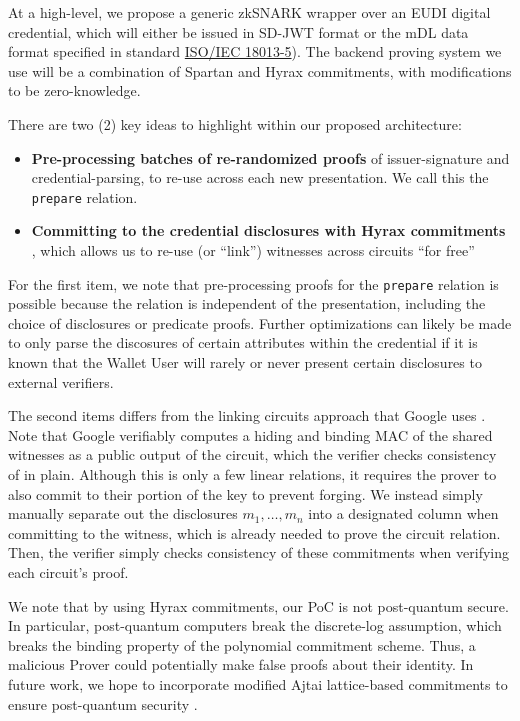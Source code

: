 At a high-level, we propose a generic zkSNARK wrapper over an EUDI digital credential, which will either be issued in SD-JWT format or the mDL data format specified in standard \href{https://mobiledl-e5018.web.app/ISO_18013-5_E_draft.pdf}{ISO/IEC 18013-5}). The backend proving system we use will be a combination of Spartan and Hyrax commitments, with modifications to be zero-knowledge. 

There are two (2) key ideas to highlight within our proposed architecture:

\begin{itemize}
    \item \textbf{Pre-processing batches of re-randomized proofs} of issuer-signature and credential-parsing, to re-use across each new presentation. We call this the \texttt{prepare} relation.
    \item \textbf{Committing to the credential disclosures with Hyrax commitments} \cite{cryptoeprint:2017/1132}, which allows us to re-use (or ``link'') witnesses across circuits ``for free''
\end{itemize}

For the first item, we note that pre-processing proofs for the \texttt{prepare} relation is possible because the relation is independent of the presentation, including the choice of disclosures or predicate proofs. 
Further optimizations can likely be made to only parse the discosures of certain attributes within the credential if it is known that the Wallet User will rarely or never present certain disclosures to external verifiers.

The second items differs from the linking circuits approach that Google uses \cite{cryptoeprint:2024/2010}. 
Note that Google verifiably computes a hiding and binding MAC of the shared witnesses as a public output of the circuit, which the verifier checks consistency of in plain. 
Although this is only a few linear relations, it requires the prover to also commit to their portion of the key to prevent forging. 
We instead simply manually separate out the disclosures $m_1, \dots, m_n$ into a designated column when committing to the witness, which is already needed to prove the circuit relation. 
Then, the verifier simply checks consistency of these commitments when verifying each circuit's proof.

We note that by using Hyrax commitments, our PoC is not post-quantum secure. 
In particular, post-quantum computers break the discrete-log assumption, which breaks the binding property of the polynomial commitment scheme.
Thus, a malicious Prover could potentially make false proofs about their identity. 
In future work, we hope to incorporate modified Ajtai lattice-based commitments to ensure post-quantum security \cite{cryptoeprint:2024/306}.

